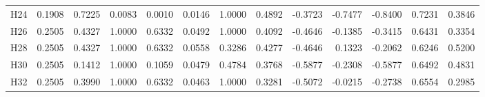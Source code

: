 \begin{table}[tbp]
\begin{tabular}{lrrrrrrrrrrrr}
H24 & 0.1908 & 0.7225 & 0.0083 & 0.0010 & 0.0146 & 1.0000 & 0.4892 & -0.3723 & -0.7477 & -0.8400 & 0.7231 & 0.3846 \\
H26 & 0.2505 & 0.4327 & 1.0000 & 0.6332 & 0.0492 & 1.0000 & 0.4092 & -0.4646 & -0.1385 & -0.3415 & 0.6431 & 0.3354 \\
H28 & 0.2505 & 0.4327 & 1.0000 & 0.6332 & 0.0558 & 0.3286 & 0.4277 & -0.4646 & 0.1323 & -0.2062 & 0.6246 & 0.5200 \\
H30 & 0.2505 & 0.1412 & 1.0000 & 0.1059 & 0.0479 & 0.4784 & 0.3768 & -0.5877 & -0.2308 & -0.5877 & 0.6492 & 0.4831 \\
H32 & 0.2505 & 0.3990 & 1.0000 & 0.6332 & 0.0463 & 1.0000 & 0.3281 & -0.5072 & -0.0215 & -0.2738 & 0.6554 & 0.2985 \\
\bottomrule
\end{tabular}
\end{table}
